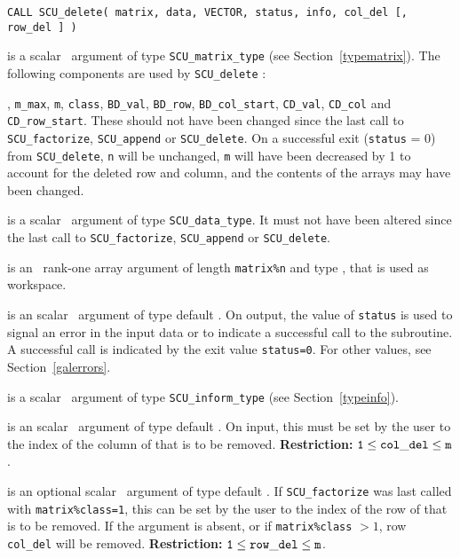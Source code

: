 \documentclass{galahad}
\newcommand{\packagename}{SCU}
\begin{document}
\hskip0.5in 
{\tt CALL \packagename\_delete( matrix, data, VECTOR, status, info,  
col\_del [, row\_del ] )}

\vspace*{-2mm}
\begin{description}
 is a scalar \intentinout\ argument of type 
{\tt \packagename\_matrix\_type} 
(see Section~\ref{typematrix}). The following components are used by 
{\tt \packagename\_delete} : 
 
\begin{description} 
, {\tt m\_max}, {\tt m}, {\tt class},
{\tt BD\_val}, {\tt BD\_row}, {\tt BD\_col\_start}, 
{\tt CD\_val}, {\tt CD\_col} and {\tt CD\_row\_start}.  
These should not have been changed since the last call to 
{\tt \packagename\_factorize}, {\tt \packagename\_append} or 
{\tt \packagename\_delete}. 
On a successful exit ({\tt status} = 0) from {\tt \packagename\_delete},  
{\tt n} will be unchanged, {\tt m} will have 
been decreased by 1 to account for the deleted row and column, and 
the contents of the arrays may have been changed. 
\end{description} 
 
 is a scalar \intentinout\ argument of type 
{\tt \packagename\_data\_type}. 
It must not have been altered since the last call to  
{\tt \packagename\_factorize}, 
{\tt \packagename\_append} or 
{\tt \packagename\_delete}. 
 
 is an \intentout\ rank-one array argument of length 
{\tt matrix\%n} 
and type \realdp, that is used as workspace. 
 
 is an scalar \intentout\ argument of type default 
\integer. 
On output, the value of {\tt status} is used to signal an error 
in the input data or to indicate a successful call to the subroutine. 
A successful call is indicated by the exit value {\tt status=0}. 
For other values, see Section~\ref{galerrors}. 
 
 is a scalar \intentinout\ argument of type 
{\tt \packagename\_inform\_type} 
(see Section~\ref{typeinfo}). 
 
 is an scalar \intentin\ argument of type 
default \integer. 
On input, this must be set by the user to the index of the column of 
 that is to be removed.  
{\bf Restriction:} ${\tt 1} \leq {\tt col\_del} \leq {\tt m}$.
 
 is an optional scalar \intentin\ argument of type  
default \integer. 
If {\tt \packagename\_factorize} was last called with {\tt matrix\%class=1}, 
this can be set by the user to the index of  
the row of  that is to be removed. If the argument is absent, or if 
{\tt  matrix\%class} $> 1$, row {\tt col\_del} will be removed. 
{\bf Restriction:} ${\tt 1} \leq {\tt row\_del} \leq {\tt m}$. 

\end{description}
\end{document}
